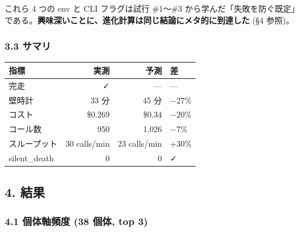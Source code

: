\documentclass[
]{ltjsarticle}
\newcounter{none} %
\begin{document}
これら 4 つの env と CLI フラグは試行 \#1〜\#3
から学んだ「失敗を防ぐ既定」である。\textbf{興味深いことに、進化計算は同じ結論にメタ的に到達した}
(§4 参照)。

\subsubsection{3.3 サマリ}\label{ux30b5ux30deux30ea}

{\def\LTcaptype{none} %
\begin{longtable}[]{@{}lrrl@{}}
\toprule\noalign{}
指標 & 実測 & 予測 & 差 \\
\midrule\noalign{}
\endhead
\bottomrule\noalign{}
\endlastfoot
完走 & ✓ & --- & --- \\
壁時計 & 33 分 & 45 分 & −27\% \\
コスト & \$0.269 & \$0.34 & −20\% \\
コール数 & 950 & 1,026 & −7\% \\
スループット & 30 calls/min & 23 calls/min & +30\% \\
silent\_death & 0 & 0 & ✓ \\
\end{longtable}
}

\subsection{4. 結果}\label{ux7d50ux679c}

\subsubsection{4.1 個体軸頻度 (38 個体, top
3)}\label{ux500bux4f53ux8ef8ux983bux5ea6-38-ux500bux4f53-top-3}
\end{document}
